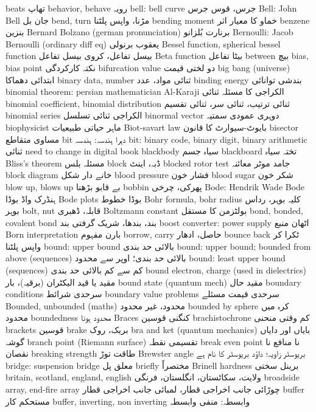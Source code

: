 beats	تھاپ
behavior, behave	رویہ
bell: bell curve	جرس،  قوس جرس
Bell: John Bell	جان بل
bend, turn	مڑنا، واپس پلٹنا
bending moment	خماو کا معیار اثر
benzene	بنزین
Bernard Bolzano (german pronunciation)	برنارت بُلزانو
Bernoulli: Jacob Bernoulli (ordinary diff eq)	یعقوب برنولی
Bessel function, spherical bessel function	بیسل تفاعل، کروی بیسل تفاعل
Beta function	بیٹا تفاعل
between	بیچ
bias, bias point	نکتہ کارکردگی
bifurcation value	دو لختی  قیمت
big bang (universe)	ابتدائی دھماکا
binary data, number	ثنائی مواد، عدد
binding energy	بندشی توانائی
binomial theorem: persian mathematician Al-Karaji	الکراجی کا مسئلہ ثنائی
binomial coefficient, binomial distribution	ثنائی ترتیب، ثنائی سر، ثنائی تقسیم
binomial series	الکراجی ثنائی تسلسل
binormal vector	دوہری عمودی سمتیہ
biophysicist	ماہر حیاتی طبیعیات
Biot-savart law	بایوٹ-سیوارٹ کا قانون
bisector	مساوی متقاطع
bit	دہرا ہندسہ: ہندسہ
bit: binary code, binary digit, binary arithmetic	ثنائی need to change in digital book
blackbody	سیاہ جسم
blackboard	تختہ سیاہ
Bliss’s theorem	مسئلہ بلس
block	ڈبہ، اینٹ
blocked rotor test	جامد موٹر معائنہ
block diagram	خانے دار شکل
blood pressure	فشار خون
blood sugar	شکر خون
blow up, blows up	بے قابو بڑھنا
bobbin	پھرکی، چرخی
Bode: Hendrik Wade Bode	ہنڈرک واڈ بوڈا
Bode plots	بوڈا خطوط
Bohr formula, bohr radius	کلیہ بوہر، رداس بوہر
bolt, nut	قابلہ، ڈھبری
Boltzmann constant	بولٹزمن کا مستقل
bond, bonded, covalent bond	بند، بندھا، شریک گرفتی بند
boost converter: power supply	اٹھان منبع
Born interpretation	بارن مفہوم
borrow, carry	حاصل، ادھار
bounce back	ٹکرا کر واپس پلٹنا
bound: upper bound	بالائی حد بندی
bound: upper bound; bounded from above (sequences)	بالائی حد بندی؛ اوپر سے محدود
bound: least upper bound (sequences)	کم سے کم بالائی حد بندی
bound electron, charge (used in dielectrics)	مقید یا قید الیکٹران (برقیہ)، بار
bound state (quantum mech)	مقید حال
boundary conditions	سرحدی شرائط
boundary value problems	سرحدی قیمت مسئلے
Bounded, unbounded (maths)	محدود، غیر محدود
bounded by sphere	کرہ میں محدود
boundedness	محدود ہونا
Braces {}	کنگنی قوسین
brachistochrone	کم وقتی منحنی
brackets	قوسین
brake	بریک، روک
bra and ket (quantum mechanics)	بایاں اور دایاں گوشہ
branch point (Riemann surface)	تقسیمی نقطہ
break even point	نا منافع نا نقصان
breaking strength	طاقت توڑ
Brewster angle	بریوسٹر زاویہ؛ داؤد بریوسٹر کا نام ہے
bridge: suspension bridge	معلق پل
briefly	مختصراً
Brinell hardness	برینل سختی
britain, scotland, england, english	ولایت، سکاٹستان، انگلستان، فرنگی
broadside array, end-fire array	چوڑائی جانب اخراجی قطار، لمبائی جانب اخراجی قطار
buffer	مستحکم کار
buffer, inverting, non inverting	وابسطہ: منفی وابسطہ
